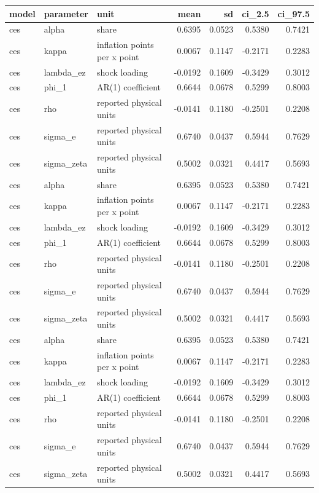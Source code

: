 \begin{tabular}{lllrrrr}
\toprule
model & parameter & unit & mean & sd & ci\_2.5 & ci\_97.5 \\
\midrule
ces & alpha & share & 0.6395 & 0.0523 & 0.5380 & 0.7421 \\
ces & kappa & inflation points per x point & 0.0067 & 0.1147 & -0.2171 & 0.2283 \\
ces & lambda\_ez & shock loading & -0.0192 & 0.1609 & -0.3429 & 0.3012 \\
ces & phi\_1 & AR(1) coefficient & 0.6644 & 0.0678 & 0.5299 & 0.8003 \\
ces & rho & reported physical units & -0.0141 & 0.1180 & -0.2501 & 0.2208 \\
ces & sigma\_e & reported physical units & 0.6740 & 0.0437 & 0.5944 & 0.7629 \\
ces & sigma\_zeta & reported physical units & 0.5002 & 0.0321 & 0.4417 & 0.5693 \\
ces & alpha & share & 0.6395 & 0.0523 & 0.5380 & 0.7421 \\
ces & kappa & inflation points per x point & 0.0067 & 0.1147 & -0.2171 & 0.2283 \\
ces & lambda\_ez & shock loading & -0.0192 & 0.1609 & -0.3429 & 0.3012 \\
ces & phi\_1 & AR(1) coefficient & 0.6644 & 0.0678 & 0.5299 & 0.8003 \\
ces & rho & reported physical units & -0.0141 & 0.1180 & -0.2501 & 0.2208 \\
ces & sigma\_e & reported physical units & 0.6740 & 0.0437 & 0.5944 & 0.7629 \\
ces & sigma\_zeta & reported physical units & 0.5002 & 0.0321 & 0.4417 & 0.5693 \\
ces & alpha & share & 0.6395 & 0.0523 & 0.5380 & 0.7421 \\
ces & kappa & inflation points per x point & 0.0067 & 0.1147 & -0.2171 & 0.2283 \\
ces & lambda\_ez & shock loading & -0.0192 & 0.1609 & -0.3429 & 0.3012 \\
ces & phi\_1 & AR(1) coefficient & 0.6644 & 0.0678 & 0.5299 & 0.8003 \\
ces & rho & reported physical units & -0.0141 & 0.1180 & -0.2501 & 0.2208 \\
ces & sigma\_e & reported physical units & 0.6740 & 0.0437 & 0.5944 & 0.7629 \\
ces & sigma\_zeta & reported physical units & 0.5002 & 0.0321 & 0.4417 & 0.5693 \\

\end{tabular}
